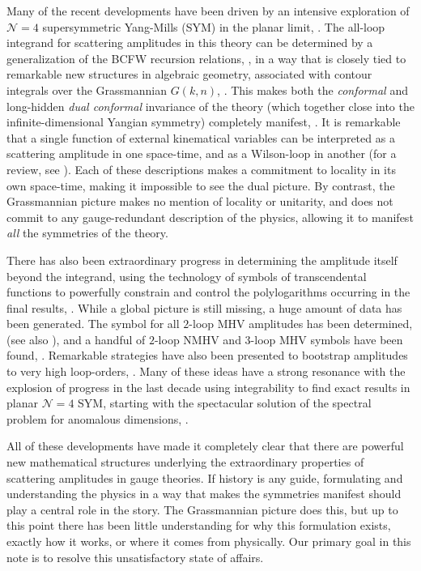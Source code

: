 \documentclass[12pt,hyperref,compress]{JHEP3}
\begin{document}
Many of the recent developments have been driven by an intensive exploration of $\mathcal{N} \!=\!4$ supersymmetric Yang-Mills (SYM) in the planar limit, \cite{Beisert:2010jr,GreyBook}. The all-loop integrand for scattering amplitudes in this theory can be determined by a generalization of the BCFW recursion relations, \cite{ArkaniHamed:2010kv}, in a way that is closely tied to remarkable new structures in algebraic geometry, associated with contour integrals over the Grassmannian $G(k,n)$, \cite{ArkaniHamed:2009dn, Mason:2009qx, ArkaniHamed:2009vw,Bourjaily:2010kw}. This makes both the {\it conformal} and long-hidden {\it dual conformal} invariance of the theory (which together close into the infinite-dimensional Yangian symmetry) completely manifest, \cite{Drummond:2010km}. It is remarkable that a single function of external kinematical variables can be interpreted as a scattering amplitude in one space-time, and as a Wilson-loop in another (for a review, see \cite{GreyBook}). Each of these descriptions makes a commitment to locality in its own space-time, making it impossible to see the dual picture. By contrast, the Grassmannian picture makes no mention of locality or unitarity, and does not commit to any gauge-redundant description of the physics, allowing it to manifest {\it all} the symmetries of the theory.

There has also been extraordinary progress in determining  the amplitude itself beyond the integrand, using the technology of symbols of transcendental functions to powerfully constrain and control the polylogarithms occurring in the final results, \cite{Goncharov:2009kx,Goncharov:2010jf}. While a global picture is still missing, a huge amount of data has been generated. The symbol for all $2$-loop MHV amplitudes has been determined, \cite{CaronHuot:2011ky} (see also \cite{Alday:2010jz}), and a handful of $2$-loop NMHV and $3$-loop MHV symbols have been found, \cite{Dixon:2011pw,Heslop:2011hv,Dixon:2011nj}. Remarkable strategies have also been presented to bootstrap amplitudes to very high loop-orders, \cite{Bourjaily:2011hi,Eden:2012tu,CaronHuot:2011kk,Sever:2011da,Sever:2012qp}. Many of these ideas have a strong resonance with the explosion of progress in the last decade using integrability to find exact results in planar $\mathcal{N} \!=\!4$ SYM, starting with the spectacular solution of the spectral problem for anomalous dimensions, \cite{Gromov:2009tv, Beisert:2010jr}.

All of these developments have made it completely clear that there are powerful new mathematical structures underlying the extraordinary properties of scattering amplitudes in gauge theories. If history is any guide, formulating and understanding the physics in a way that makes the symmetries manifest should play a central role in the story. The Grassmannian picture does this, but up to this point there has been little understanding for why this formulation exists, exactly how it works,  or where it comes from physically. Our primary goal in this note is to resolve this unsatisfactory state of affairs.
\end{document}
